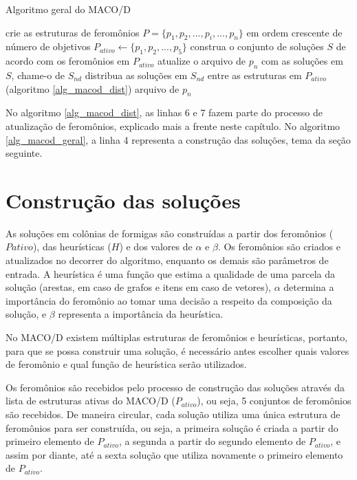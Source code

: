 \begin{algorithm}
	\caption{Algoritmo geral do MACO/D}
	\label{alg_macod_geral}
	\begin{algorithmic}[1]
		\State crie as estruturas de feromônios $P = \{p_1, p_2, ..., p_i, ..., p_n\}$ em ordem crescente de número de objetivos
		\State $P_{ativo} \gets \{p_1, p_2, ..., p_5\}$
			\State construa o conjunto de soluções $S$ de acordo com os feromônios em $P_{ativo}$
			\State atualize o arquivo de $p_n$ com as soluções em $S$, chame-o de $S_{nd}$
			\State distribua as soluções em $S_{nd}$ entre as estruturas em $P_{ativo}$ (algoritmo \ref{alg_macod_dist})
		\EndWhile
		\State \Return arquivo de $p_n$
	\end{algorithmic}
\end{algorithm}

No algoritmo \ref{alg_macod_dist}, as linhas 6 e 7 fazem parte do processo de atualização de feromônios, explicado mais a frente neste capítulo. No algoritmo \ref{alg_macod_geral}, a linha 4 representa a construção das soluções, tema da seção seguinte.

\section{Construção das soluções}

As soluções em colônias de formigas são construídas a partir dos feromônios ($P{ativo}$), das heurísticas ($H$) e dos valores de $\alpha$ e $\beta$. Os feromônios são criados e atualizados no decorrer do algoritmo, enquanto os demais são parâmetros de entrada. A heurística é uma função que estima a qualidade de uma parcela da solução (arestas, em caso de grafos e itens em caso de vetores), $\alpha$ determina a importância do feromônio ao tomar uma decisão a respeito da composição da solução, e $\beta$ representa a importância da heurística.

No MACO/D existem múltiplas estruturas de feromônios e heurísticas, portanto, para que se possa construir uma solução, é necessário antes escolher quais valores de feromônio e qual função de heurística serão utilizados. 

Os feromônios são recebidos pelo processo de construção das soluções através da lista de estruturas ativas do MACO/D ($P_{ativo}$), ou seja, 5 conjuntos de feromônios são recebidos. De maneira circular, cada solução utiliza uma única estrutura de feromônios para ser construída, ou seja, a primeira solução é criada a partir do primeiro elemento de $P_{ativo}$, a segunda a partir do segundo elemento de $P_{ativo}$, e assim por diante, até a sexta solução que utiliza novamente o primeiro elemento de $P_{ativo}$.

